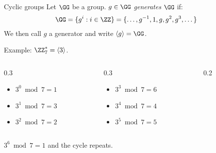 \begin{frame}{Cyclic groups}
  Let $\GG$ be a group.
  $g \in \GG$ \emph{generates} $\GG$ if:
  \[
    \GG = \{g^i:i\in\ZZ\} = \{\dots, g^{-1}, 1, g, g^2, g^3, \dots\}
  \]
  \pause
  We then call $g$ a generator and write $\langle g\rangle = \GG$.

  \vspace*{0.5em}

  \pause
  Example: $\ZZ_7^* = \langle 3\rangle$.
  \pause
  \begin{columns}[T]
    \begin{column}{0.3\textwidth}
      \begin{itemize}
        \item $3^0 \bmod{7} = 1$
        \item $3^1 \bmod{7} = 3$
        \item $3^2 \bmod{7} = 2$
      \end{itemize}
    \end{column}
    \begin{column}{0.3\textwidth}
      \begin{itemize}
        \item $3^3 \bmod{7} = 6$
        \item $3^4 \bmod{7} = 4$
        \item $3^5 \bmod{7} = 5$
      \end{itemize}
    \end{column}
    \begin{column}{0.2\textwidth}
    \end{column}
  \end{columns}

  \vspace*{0.5em}

  \pause
  $3^6 \bmod 7 = 1$ and the cycle repeats.

\end{frame}


